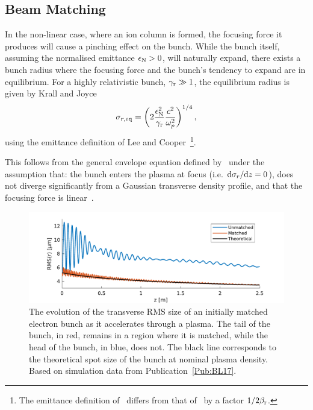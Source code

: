 \subsection{Beam Matching}
\label{Int:BPI:Match}

In the non-linear case, where an ion column is formed, the focusing force it produces will cause a pinching effect on the bunch.
While the bunch itself, assuming the normalised emittance $\epsilon_{\mathrm{N}} > 0$, will naturally expand, there exists a bunch radius where the focusing force and the bunch's tendency to expand are in equilibrium.
For a highly relativistic bunch, $\gamma_{\mathrm{r}} \gg 1$, the equilibrium radius is given by Krall and Joyce~\cite{krall:1995}
\begin{equation}
    \sigma_{r,\mathrm{eq}} = \left(2\frac{\epsilon_{\mathrm{N}}^2}{\gamma_{\mathrm{r}}} \frac{c^2}{\omega_{p}^2} \right)^{1/4}, \label{EQ:BMatch}
\end{equation}
using the emittance definition of Lee and Cooper~\cite{lee:1976}\footnote{The emittance definition of~\cite{krall:1995} differs from that of~\cite{lee:1976} by a factor $1/2\beta_{\mathrm{r}}$.}.

This follows from the general envelope equation defined by~\cite{lee:1976} under the assumption that: the bunch enters the plasma at focus (i.e. $\mathrm{d}\sigma_{r}/\mathrm{d} z = 0$), does not diverge significantly from a Gaussian transverse density profile, and that the focusing force is linear~\cite{krall:1995}.

\begin{figure}[hbt]
    \centering
    \includegraphics[width=0.875\linewidth,trim={0mm 0mm 0mm 0mm},clip]{figures/BeamMatching}
    \caption{\label{Fig:BPI:Match}
        The evolution of the transverse RMS size of an initially matched electron bunch as it accelerates through a plasma.
        The tail of the bunch, in red, remains in a region where it is matched, while the head of the bunch, in blue, does not.
        The black line corresponds to the theoretical spot size of the bunch at nominal plasma density.
        Based on simulation data from Publication~\ref{Pub:BL17}.
    }
\end{figure}

